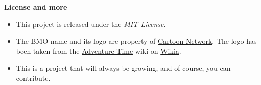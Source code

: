\pagebreak

\Large
\textbf{License and more}

\normalsize
\begin{itemize}
\item[\textbullet]This project is released under the \emph{MIT License}.
\item[\textbullet]The BMO name and its logo are property of \href{http://www.cartoonnetwork.com/}{Cartoon Network}. The logo has been taken from the \href{http://adventuretime.wikia.com/}{Adventure Time} wiki on \href{http://www.wikia.com/}{Wikia}.
\item[\textbullet]This is a project that will always be growing, and of course, you can contribute.
\end{itemize}
